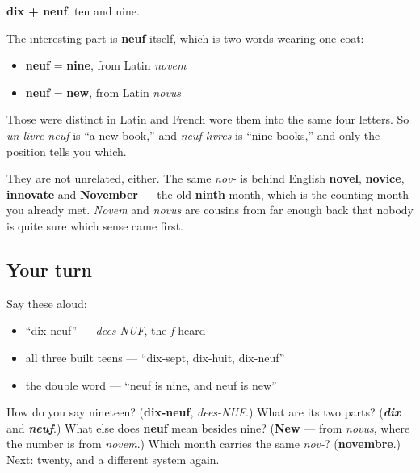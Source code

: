\begin{cousinweb}
\textbf{dix + neuf}, ten and nine.

The interesting part is \textbf{neuf} itself, which is two words wearing one coat:

\begin{itemize}
\raggedright
  \item \textbf{neuf} = \textbf{nine}, from Latin \emph{novem}
  \item \textbf{neuf} = \textbf{new}, from Latin \emph{novus}
\end{itemize}

Those were distinct in Latin and French wore them into the same four letters. So \emph{un livre neuf} is \textquotedblleft{}a new book,\textquotedblright{} and \emph{neuf livres} is \textquotedblleft{}nine books,\textquotedblright{} and only the position tells you which.

They are not unrelated, either. The same \emph{nov-} is behind English \textbf{novel}, \textbf{novice}, \textbf{innovate} and \textbf{November} — the old \textbf{ninth} month, which is the counting month you already met. \emph{Novem} and \emph{novus} are cousins from far enough back that nobody is quite sure which sense came first.
\end{cousinweb}

\subsection*{Your turn}
Say these aloud:

\begin{itemize}
\raggedright
  \item \textquotedblleft{}dix-neuf\textquotedblright{} — \emph{dees-NUF}, the \emph{f} heard
  \item all three built teens — \textquotedblleft{}dix-sept, dix-huit, dix-neuf\textquotedblright{}
  \item the double word — \textquotedblleft{}neuf is nine, and neuf is new\textquotedblright{}
\end{itemize}

\begin{tcolorbox}[breakable,colback=teal!4,colframe=teal!35!black,title={Before you move on}]
How do you say nineteen? (\textbf{dix-neuf}, \emph{dees-NUF}.) What are its two parts? (\emph{\textbf{dix}} and \emph{\textbf{neuf}}.) What else does \textbf{neuf} mean besides nine? (\textbf{New} — from \emph{novus}, where the number is from \emph{novem}.) Which month carries the same \emph{nov-}? (\textbf{novembre}.) Next: twenty, and a different system again.
\end{tcolorbox}
